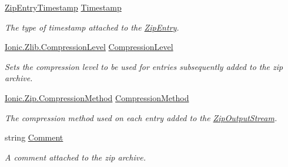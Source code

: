 \begin{DoxyCompactItemize}
\mbox{\hyperlink{namespace_super_tiled2_unity_1_1_ionic_1_1_zip_afa5034d6b4915c0633b590a28622f7fd}{Zip\+Entry\+Timestamp}} \mbox{\hyperlink{class_super_tiled2_unity_1_1_ionic_1_1_zip_1_1_zip_output_stream_a460b67a16c9154f213cdd7eb94e9e3db}{Timestamp}}
\begin{DoxyCompactList}\small\item\em The type of timestamp attached to the \mbox{\hyperlink{class_super_tiled2_unity_1_1_ionic_1_1_zip_1_1_zip_entry}{Zip\+Entry}}. \end{DoxyCompactList}\item 
\mbox{\hyperlink{namespace_super_tiled2_unity_1_1_ionic_1_1_zlib_a20f6771804996c363f454ad9765cd7db}{Ionic.\+Zlib.\+Compression\+Level}} \mbox{\hyperlink{class_super_tiled2_unity_1_1_ionic_1_1_zip_1_1_zip_output_stream_ab18e466bb7d16f7131c5a543cb9a3453}{Compression\+Level}}
\begin{DoxyCompactList}\small\item\em Sets the compression level to be used for entries subsequently added to the zip archive. \end{DoxyCompactList}\item 
\mbox{\hyperlink{namespace_super_tiled2_unity_1_1_ionic_1_1_zip_a48fd7a4529dd87fb2fda54f62ae3d8a3}{Ionic.\+Zip.\+Compression\+Method}} \mbox{\hyperlink{class_super_tiled2_unity_1_1_ionic_1_1_zip_1_1_zip_output_stream_a277b3eee8ff85940ed16ba2cc69a19cf}{Compression\+Method}}
\begin{DoxyCompactList}\small\item\em The compression method used on each entry added to the \mbox{\hyperlink{class_super_tiled2_unity_1_1_ionic_1_1_zip_1_1_zip_output_stream}{Zip\+Output\+Stream}}. \end{DoxyCompactList}\item 
string \mbox{\hyperlink{class_super_tiled2_unity_1_1_ionic_1_1_zip_1_1_zip_output_stream_a36027bbb7ea2355884a7922b429a3913}{Comment}}
\begin{DoxyCompactList}\small\item\em A comment attached to the zip archive. \end{DoxyCompactList}\item 

\end{DoxyCompactItemize}
